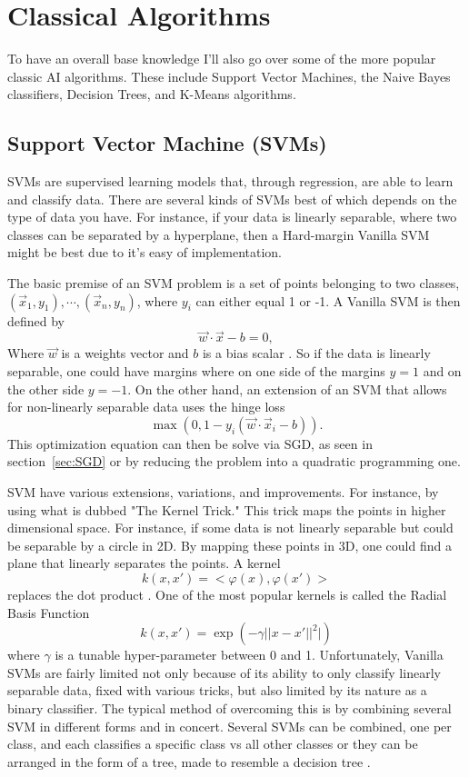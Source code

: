 \section{Classical Algorithms}

To have an overall base knowledge I'll also go over some of the more popular classic AI algorithms. These include Support Vector Machines, the Naive Bayes classifiers, Decision Trees, and K-Means algorithms.

\subsection{Support Vector Machine (SVMs)}

SVMs are supervised learning models that, through regression, are able to learn and classify data. There are several kinds of SVMs best of which depends on the type of data you have. For instance, if your data is linearly separable, where two classes can be separated by a hyperplane, then a Hard-margin Vanilla SVM might be best due to it's easy of implementation. 

The basic premise of an SVM problem is a set of points belonging to two classes, $(\vec{x}_1, y_1),\cdots, (\vec{x}_n, y_n)$, where $y_i$ can either equal 1 or -1. A Vanilla SVM is then defined by $$\vec{w}\cdot \vec{x}-b=0,$$ Where $\vec{w}$ is a weights vector and $b$ is a bias scalar \cite{cortes_vapnik_1995}. So if the data is linearly separable, one could have margins where on one side of the margins $y=1$ and on the other side $y=-1$. On the other hand, an extension of an SVM that allows for non-linearly separable data uses the hinge loss $$\max(0, 1-y_i(\vec{w}\cdot \vec{x}_i-b)).$$ This optimization equation can then be solve via SGD, as seen in section~\ref{sec:SGD} or by reducing the problem into a quadratic programming one. 

SVM have various extensions, variations, and improvements. For instance, by using what is dubbed "The Kernel Trick." This trick maps the points in higher dimensional space. For instance, if some data is not linearly separable but could be separable by a circle in 2D. By mapping these points in 3D, one could find a plane that linearly separates the points. A kernel $$k(x, x')=<\varphi(x), \varphi(x')>$$ replaces the dot product \cite{hofmann_scholkopf_smola_2008}. One of the most popular kernels is called the Radial Basis Function $$k(x, x')=\exp(-\gamma ||x-x'||^2|)$$ where $\gamma$ is a tunable hyper-parameter between 0 and 1. Unfortunately, Vanilla SVMs are fairly limited not only because of its ability to only classify linearly separable data, fixed with various tricks, but also limited by its nature as a binary classifier. The typical method of overcoming this is by combining several SVM in different forms and in concert. Several SVMs can be combined, one per class, and each classifies a specific class vs all other classes or they can be arranged in the form of a tree, made to resemble a decision tree \cite{xu_lu_zou_2015}.


